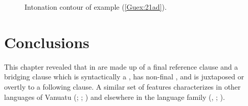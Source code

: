 \documentclass[output=paper]{LSP/langsci}
\begin{document}
\begin{figure}[ht]
\caption{Intonation contour of example (\ref{Guex:21ad}). \label{GuF8}}
\end{figure}




\section{Conclusions}
\label{Guconclu}
This chapter  revealed that  in  are made up of a final reference clause and a bridging clause which is syntactically a , has non-final , and is juxtaposed or overtly  to a following clause. A similar set of features characterizes  in other languages of Vanuatu (\citealt[][24--26]{Schneider09}; \citealt[][327]{Thieberger06}; \citealt[][426]{hyslop01}) and elsewhere in the  language family (\citealt{palmer09,Frostad2012}, \citealt[][172]{hamel88}; \citealt[][115--116]{Schokkin14} \citealt[][94]{Lithgow95}). 
\end{document}
